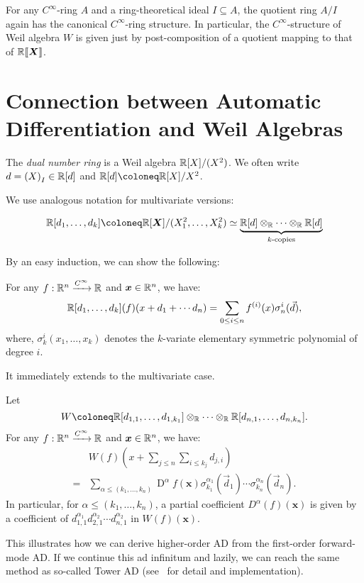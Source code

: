 \documentclass[%
  sigconf,authorversion,screen]{acmart}
\begin{document}
\begin{lemma}
  For any $C^\infty$-ring $A$ and a ring-theoretical ideal $I \subseteq A$, the quotient ring $A/I$ again has the canonical $C^\infty$-ring structure.
  In particular, the $C^\infty$-structure of Weil algebra $W$ is given just by post-composition of a quotient mapping to that of $\mathord{\mathbb{R}\llbracket\boldsymbol{X}\rrbracket}$.
\end{lemma}

\section{Connection between Automatic Differentiation and Weil Algebras}
\label{sec:ad-and-weils}

\begin{definition}
  The \emph{dual number ring} is a Weil algebra $\mathbb{R}[X]/(X^2)$.
  We often write $d = {(X)}_I \in \mathbb{R}[d]$ and $\R[d] \coloneq \R[X]/X^2$.

  We use analogous notation for multivariate versions:
  
  \[
    \R[d_1, \dots, d_k] \coloneq \R[\X]/(X_1^2, \dots, X_k^2)
    \simeq \underbrace{\R[d] \otimes_\R \dots \otimes_\R \R[d]}_{k\text{-copies}}
  \]
\end{definition}

By an easy induction, we can show the following:
\begin{theorem}\label{thm:univ-partial-duals}
  For any $f: \mathbb{R}^n \xrightarrow{C^\infty} \mathbb{R}$ and $\boldsymbol{x} \in \mathbb{R}^n$, we have:
  \[
    \mathbb{R}[d_1, \dots, d_k](f)(x + d_1 + \cdots d_n) 
    = \sum_{0 \leq i \leq n} f^{(i)}(x)\sigma^i_n(\vec{d}),
  \]
  where, $\sigma^i_k(x_1, \dots, x_k)$ denotes the $k$-variate elementary symmetric polynomial of degree $i$.
\end{theorem}

It immediately extends to the multivariate case.

\begin{theorem}\label{thm:multi-partial-duals}
  Let
  \[
    W \coloneq \R[d_{1,1}, \dots, d_{1,k_1}] \otimes_\R \dots \otimes_\R \R[d_{n,1}, \dots, d_{n,k_n}].
  \]
  For any $f: \mathbb{R}^n \xrightarrow{C^\infty} \mathbb{R}$ and $\boldsymbol{x} \in \mathbb{R}^n$, we have:
  \begin{align*}
    &W(f)\left(x + \sum_{j \leq n}\sum_{i \leq k_j} d_{j,i}\right) \\
    = &\sum_{\alpha \leq (k_1,\dots,k_n)} \mathop{D}\nolimits^\alpha f(\boldsymbol{x})
    \sigma^{\alpha_1}_{k_1}(\vec{d}_1) 
    \cdots
    \sigma^{\alpha_n}_{k_n}(\vec{d}_n).
  \end{align*}
  In particular, for $\alpha \leq (k_1, \dots, k_n)$, a partial coefficient $D^\alpha(f)(\boldsymbol{x})$ is given by a coefficient of $d_{1,1}^{\alpha_1} d_{2,1}^{\alpha_2} \cdots d_{n,1}^{\alpha_2}$ in $W(f)(\boldsymbol{x})$.
\end{theorem}
This illustrates how we can derive higher-order AD from the first-order forward-mode AD.
If we continue this ad infinitum and lazily, we can reach the same method as so-called Tower AD (see~\cite{Pearlmutter:2007aa,Kmett:2010aa} for detail and implementation).
\end{document}

